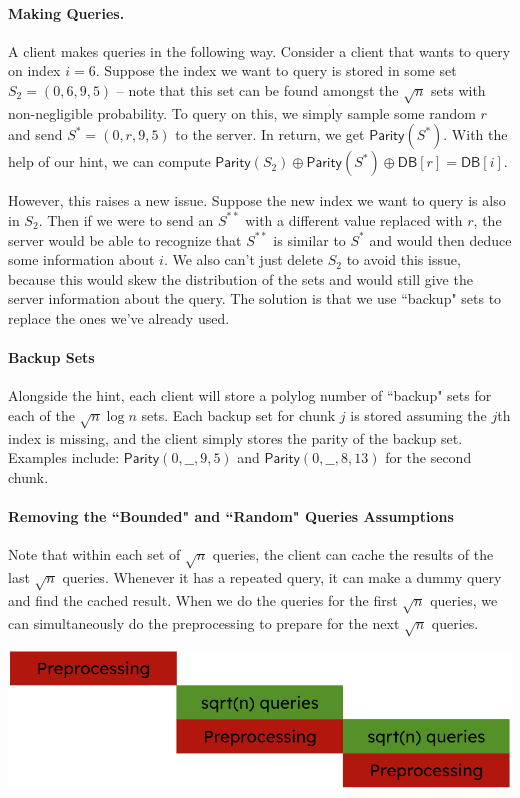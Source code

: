 {\paragraph{Making Queries.}
A client makes queries in the following way. Consider a client that wants to query on index $i = 6$. Suppose the index we want to query is stored in some set $S_2 = (0, 6, 9, 5)$ -- note that this set can be found amongst the $\sqrt{n}$ sets with non-negligible probability. To query on this, we simply sample some random $r$ and send $S^* = (0, r, 9, 5)$ to the server. In return, we get $\mathsf{Parity}(S^*)$. With the help of our hint, we can compute $\mathsf{Parity}(S_2) \oplus \mathsf{Parity}(S^*) \oplus \mathsf{DB}[r] = \mathsf{DB}[i]$.

However, this raises a new issue. Suppose the new index we want to query is also in $S_2$. Then if we were to send an $S^{**}$ with a different value replaced with $r$, the server would be able to recognize that $S^{**}$ is similar to $S^*$ and would then deduce some information about $i$. We also can't just delete $S_2$ to avoid this issue, because this would skew the distribution of the sets and would still give the server information about the query. The solution is that we use ``backup" sets to replace the ones we've already used.

\paragraph{Backup Sets}
Alongside the hint, each client will store a polylog number of ``backup" sets for each of the $\sqrt{n}\log n$ sets. Each backup set for chunk $j$ is stored assuming the $j$th index is missing, and the client simply stores the parity of the backup set. Examples include: $\mathsf{Parity}(0, \_\_, 9, 5)$ and $\mathsf{Parity}(0, \_\_, 8, 13)$ for the second chunk. 

\paragraph{Removing the ``Bounded" and ``Random" Queries Assumptions}
Note that within each set of $\sqrt{n}$ queries, the client can cache the results of the last $\sqrt{n}$ queries. Whenever it has a repeated query, it can make a dummy query and find the cached result. When we do the queries for the first $\sqrt{n}$ queries, we can simultaneously do the preprocessing to prepare for the next $\sqrt{n}$ queries.

\begin{center}
    \includegraphics[scale=0.77]{scrbimg.png}
\end{center}

}
